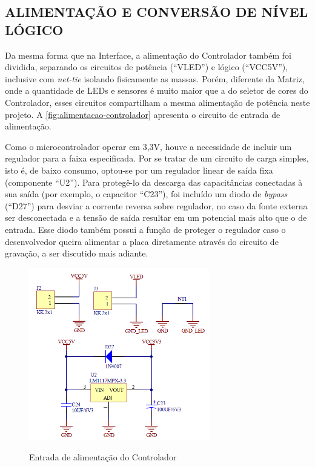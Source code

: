 \subsection{ALIMENTAÇÃO  E CONVERSÃO DE NÍVEL LÓGICO}
\label{subsec:alimentacao}

Da mesma forma que na Interface, a alimentação do Controlador também foi dividida, separando os circuitos de potência (``VLED'') e lógico (``VCC5V''), inclusive com \emph{net-tie} isolando fisicamente as massas. Porém, diferente da Matriz, onde a quantidade de LEDs e sensores é muito maior que a do seletor de cores do Controlador, esses circuitos compartilham a mesma alimentação de potência neste projeto. A \autoref{fig:alimentacao-controlador} apresenta o circuito de entrada de alimentação.

Como o microcontrolador operar em 3,3V, houve a necessidade de incluir um regulador para a faixa especificada. Por se tratar de um circuito de carga simples, isto é, de baixo consumo, optou-se por um regulador linear de saída fixa (componente ``U2''). Para protegê-lo da descarga das capacitâncias conectadas à sua saída (por exemplo, o capacitor ``C23''), foi incluído um diodo de \emph{bypass} (``D27'') para desviar a corrente reversa sobre regulador, no caso da fonte externa ser desconectada e a tensão de saída resultar em um potencial mais alto que o de entrada. Esse diodo também possui a função de proteger o regulador caso o desenvolvedor queira alimentar a placa diretamente através do circuito de gravação, a ser discutido mais adiante.

\begin{figure}[H]
    \centering
    \caption{Entrada de alimentação do Controlador}
    \includegraphics[width=0.7\textwidth]{./dados/figuras/alimentacao-controlador}
    \label{fig:alimentacao-controlador}
\end{figure}

